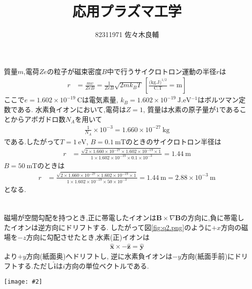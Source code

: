 \documentclass[uplatex,a4j,11pt,dvipdfmx]{jsarticle}
\makeatletter
\def\fgcaption{\def\@captype{figure}\caption}
\newcommand{\mfig}[3][width=15cm]{
\begin{center}
\texttt{[image: \#2]}
\fgcaption{#3 \label{fig:#2}}
\end{center}
}
\makeatother
\begin{document}
\title{応用プラズマ工学}
\author{82311971 佐々木良輔}
\date{}
\maketitle
\section{}
質量$m$,電荷$Ze$の粒子が磁束密度$B$中で行うサイクロトロン運動の半径$r$は
\begin{align}
  r&=\frac{mv}{ZeB}=\frac{1}{ZeB}\sqrt{2mk_BT}\ \left[\frac{\si{(\kilo\gram.\joule)^{1/2}}}{\si{\coulomb.\tesla}}=\si{\metre}\right]
\end{align}
ここで$e=1.602\times10^{-19}\ \si{\coulomb}$は電気素量, $k_B=1.602\times10^{-19}\ \si{\joule.\electronvolt^{-1}}$はボルツマン定数である.
水素負イオンにおいて,電荷は$Z=1$, 質量は水素の原子量が$1$であることからアボガドロ数$N_A$を用いて
\begin{align}
  \frac{1}{N_A}\times10^{-3}=1.660\times10^{-27}\ \si{\kilo\gram}
\end{align}
である.したがって$T=1\ \si{\electronvolt}$, $B=0.1\ \si{\milli\tesla}$のときのサイクロトロン半径は
\begin{align}
    r&=\frac{\sqrt{2\times1.660\times10^{-27}\times1.602\times10^{-19}\times1}}{1\times1.602\times10^{-19}\times0.1\times10^{-3}}=1.44\ \si{\metre}
\end{align}
$B=50\ \si{\milli\tesla}$のときは
\begin{align}
  r&=\frac{\sqrt{2\times1.660\times10^{-27}\times1.602\times10^{-19}\times1}}{1\times1.602\times10^{-19}\times50\times10^{-3}}=1.44\ \si{\metre}=2.88\times10^{-3}\ \si{\metre}
\end{align}
となる.
\newpage
\section{}
磁場が空間勾配を持つとき,正に帯電したイオンは${\bm B}\times\nabla {\bm B}$の方向に,負に帯電したイオンは逆方向にドリフトする.
したがって図\ref{fig:q2.png}のように$+x$方向の磁場を$-z$方向に勾配させたとき,水素(正)イオンは
\begin{align}
  \hat{\bm x}\times-\hat{\bm z}=\hat{\bm y}
\end{align}
より$+y$方向(紙面奥)へドリフトし,
逆に水素負イオンは$-y$方向(紙面手前)にドリフトする.ただし$\hat{\bm i}$は$i$方向の単位ベクトルである.
\mfig[width=6cm]{q2.png}{磁場とその空間勾配\cite{hatayamaPresentStatusNumerical2018}}
\end{document}
